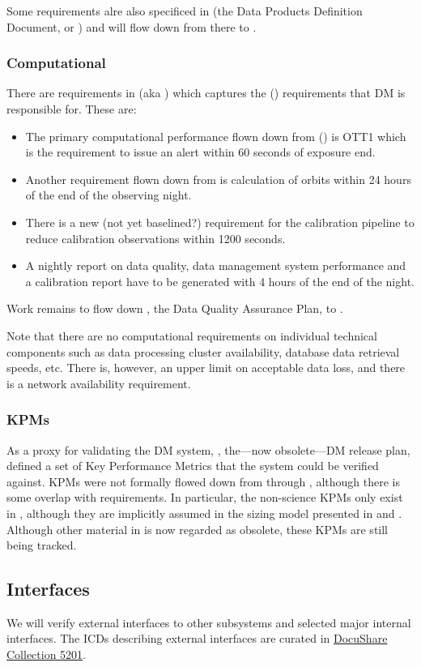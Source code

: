 Some requirements alre also specificed in  (the Data Products Definition Document, or \DPDD) and will flow down from there to .

\subsubsection{Computational}

There are requirements in  (aka \DMSR) which captures the  (\OSS) requirements that DM is responsible for. These are:

\begin{itemize}

\item The primary computational performance flown down from  (\LSR) is OTT1 which is the requirement to issue an alert within 60 seconds of exposure end.

\item Another requirement flown down from  is calculation of orbits within 24 hours of the end of the observing night.

\item There is a new (not yet baselined?) requirement for the calibration pipeline to reduce calibration observations within 1200 seconds.

\item A nightly report on data quality, data management system performance and a calibration report have to be generated with 4 hours of the end of the night.

\end{itemize}

Work remains to flow down , the Data Quality Assurance Plan, to .

Note that there are no computational requirements on individual technical components such as data processing cluster availability, database data retrieval speeds, etc. There is, however, an upper limit on acceptable data loss, and there is a network availability requirement.

\subsubsection{KPMs}

As a proxy for validating the DM system, , the---now obsolete---DM release plan, defined a set of Key Performance Metrics that the system could be verified against.
KPMs were not formally flowed down from  through , although there is some overlap with  requirements.
In particular, the non-science KPMs only exist in , although they are implicitly assumed in the sizing model presented in  and .
Although other material in  is now regarded as obsolete, these KPMs are still being tracked.

\subsection{Interfaces}

We will verify external interfaces to other subsystems and selected major internal interfaces. The ICDs describing external interfaces are curated in \href{https://ls.st/Collection-5201}{DocuShare Collection 5201}.
